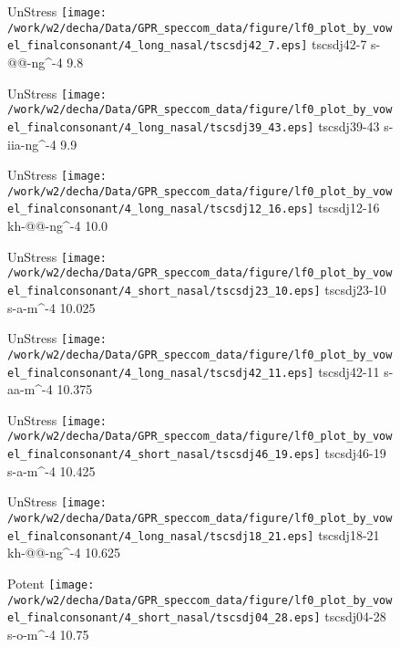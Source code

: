 \documentclass{article}
\begin{document}
\begin{figure}[t]
\begin{minipage}[b]{.24\textwidth}
UnStress
\centering
\texttt{[image: /work/w2/decha/Data/GPR\_speccom\_data/figure/lf0\_plot\_by\_vowel\_finalconsonant/4\_long\_nasal/tscsdj42\_7.eps]}
tscsdj42-7 s-@@-ng\textasciicircum-4 9.8
\end{minipage}
\begin{minipage}[b]{.24\textwidth}
UnStress
\centering
\texttt{[image: /work/w2/decha/Data/GPR\_speccom\_data/figure/lf0\_plot\_by\_vowel\_finalconsonant/4\_long\_nasal/tscsdj39\_43.eps]}
tscsdj39-43 s-iia-ng\textasciicircum-4 9.9
\end{minipage}
\begin{minipage}[b]{.24\textwidth}
UnStress
\centering
\texttt{[image: /work/w2/decha/Data/GPR\_speccom\_data/figure/lf0\_plot\_by\_vowel\_finalconsonant/4\_long\_nasal/tscsdj12\_16.eps]}
tscsdj12-16 kh-@@-ng\textasciicircum-4 10.0
\end{minipage}
\begin{minipage}[b]{.24\textwidth}
UnStress
\centering
\texttt{[image: /work/w2/decha/Data/GPR\_speccom\_data/figure/lf0\_plot\_by\_vowel\_finalconsonant/4\_short\_nasal/tscsdj23\_10.eps]}
tscsdj23-10 s-a-m\textasciicircum-4 10.025
\end{minipage}
\end{figure}

\begin{figure}[t]
\begin{minipage}[b]{.24\textwidth}
UnStress
\centering
\texttt{[image: /work/w2/decha/Data/GPR\_speccom\_data/figure/lf0\_plot\_by\_vowel\_finalconsonant/4\_long\_nasal/tscsdj42\_11.eps]}
tscsdj42-11 s-aa-m\textasciicircum-4 10.375
\end{minipage}
\begin{minipage}[b]{.24\textwidth}
UnStress
\centering
\texttt{[image: /work/w2/decha/Data/GPR\_speccom\_data/figure/lf0\_plot\_by\_vowel\_finalconsonant/4\_short\_nasal/tscsdj46\_19.eps]}
tscsdj46-19 s-a-m\textasciicircum-4 10.425
\end{minipage}
\begin{minipage}[b]{.24\textwidth}
UnStress
\centering
\texttt{[image: /work/w2/decha/Data/GPR\_speccom\_data/figure/lf0\_plot\_by\_vowel\_finalconsonant/4\_long\_nasal/tscsdj18\_21.eps]}
tscsdj18-21 kh-@@-ng\textasciicircum-4 10.625
\end{minipage}
\begin{minipage}[b]{.24\textwidth}
\colorbox{Apricot}{Potent}
\centering
\texttt{[image: /work/w2/decha/Data/GPR\_speccom\_data/figure/lf0\_plot\_by\_vowel\_finalconsonant/4\_short\_nasal/tscsdj04\_28.eps]}
tscsdj04-28 s-o-m\textasciicircum-4 10.75
\end{minipage}
\end{figure}
\end{document}
